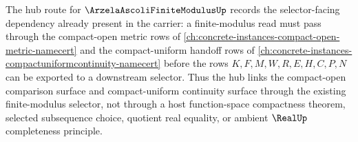 The hub route for $\ArzelaAscoliFiniteModulusUp$ records the selector-facing dependency already present in the carrier: a finite-modulus read must pass through the compact-open metric rows of \autoref{ch:concrete-instances-compact-open-metric-namecert} and the compact-uniform handoff rows of \autoref{ch:concrete-instances-compactuniformcontinuity-namecert} before the rows $K,F,M,W,R,E,H,C,P,N$ can be exported to a downstream selector. Thus the hub links the compact-open comparison surface and compact-uniform continuity surface through the existing finite-modulus selector, not through a host function-space compactness theorem, selected subsequence choice, quotient real equality, or ambient $\RealUp$ completeness principle.
